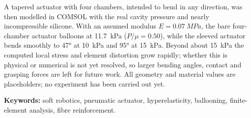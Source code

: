 \documentclass[12pt,a4paper,oneside]{report}
\numberwithin{equation}{chapter}
\numberwithin{figure}{chapter}
\numberwithin{table}{chapter}
\begin{document}
A tapered actuator with four chambers, intended to bend in any direction, was then modelled in COMSOL
with the real cavity pressure and nearly incompressible silicone. With an assumed modulus $E=\SI{0.07}{MPa}$, the
bare four-chamber actuator balloons at \SI{11.7}{kPa} ($P/\mu=0.50$), while the sleeved actuator bends
smoothly to \ang{47} at \SI{10}{kPa} and \ang{95} at \SI{15}{kPa}. Beyond about \SI{15}{kPa} the computed
local stress and element distortion grow rapidly; whether this is physical or numerical is not yet
resolved, so larger bending angles, contact and grasping forces are left for future work. All geometry and
material values are placeholders; no experiment has been carried out yet.

\vspace{0.5em}
\noindent\textbf{Keywords:} soft robotics, pneumatic actuator, hyperelasticity, ballooning, finite-element
analysis, fibre reinforcement.

\end{document}
